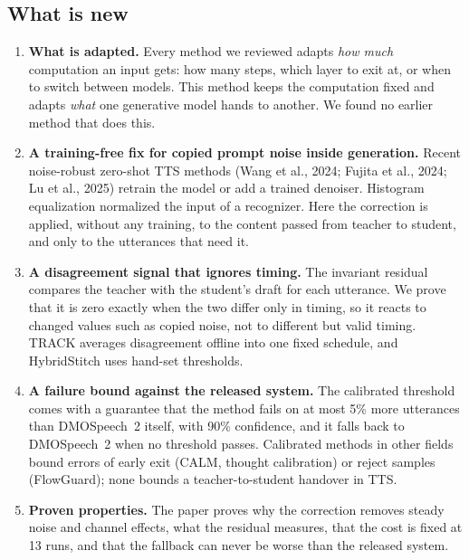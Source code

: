 \documentclass[11pt,a4paper]{article}
\newcommand{\st}[1]{\textbf{#1}}
\begin{document}
\subsection*{What is new}
\begin{enumerate}
\item \st{What is adapted.} Every method we reviewed adapts \emph{how much} computation an input gets: how many steps, which layer to exit at, or when to switch between models. This method keeps the computation fixed and adapts \emph{what} one generative model hands to another. We found no earlier method that does this.
\item \st{A training-free fix for copied prompt noise inside generation.} Recent noise-robust zero-shot TTS methods (Wang et al., 2024; Fujita et al., 2024; Lu et al., 2025) retrain the model or add a trained denoiser. Histogram equalization normalized the input of a recognizer. Here the correction is applied, without any training, to the content passed from teacher to student, and only to the utterances that need it.
\item \st{A disagreement signal that ignores timing.} The invariant residual compares the teacher with the student's draft for each utterance. We prove that it is zero exactly when the two differ only in timing, so it reacts to changed values such as copied noise, not to different but valid timing. TRACK averages disagreement offline into one fixed schedule, and HybridStitch uses hand-set thresholds.
\item \st{A failure bound against the released system.} The calibrated threshold comes with a guarantee that the method fails on at most 5\% more utterances than DMOSpeech~2 itself, with 90\% confidence, and it falls back to DMOSpeech~2 when no threshold passes. Calibrated methods in other fields bound errors of early exit (CALM, thought calibration) or reject samples (FlowGuard); none bounds a teacher-to-student handover in TTS.
\item \st{Proven properties.} The paper proves why the correction removes steady noise and channel effects, what the residual measures, that the cost is fixed at 13 runs, and that the fallback can never be worse than the released system.
\end{enumerate}
\end{document}
